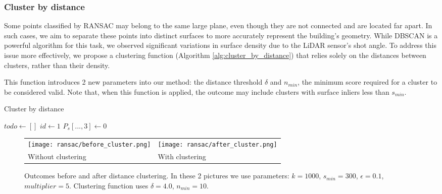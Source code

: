 \documentclass[a4paper,9pt]{article}
\begin{document}
\subsubsection{Cluster by distance}
Some points classified by RANSAC may belong to the same large plane, even though they are not connected and are located far apart. In such cases, we aim to separate these points into distinct surfaces to more accurately represent the building's geometry. While DBSCAN is a powerful algorithm for this task, we observed significant variations in surface density due to the LiDAR sensor's shot angle. To address this issue more effectively, we propose a clustering function (Algorithm \ref{alg:cluster_by_distance}) that relies solely on the distances between clusters, rather than their density.
\\\par
This function introduces 2 new parameters into our method: the distance threshold $\delta$ and $n_{min}$, the minimum score required for a cluster to be considered valid. Note that, when this function is applied, the outcome may include clusters with surface inliers less than $s_{min}$.

\begin{algorithm}[H]
\caption{Cluster by distance}
\label{alg:cluster_by_distance}

$todo \gets [ ]$\;
$id \gets 1$\;
$P_s[...,3] \gets 0$\;

\end{algorithm}

\begin{figure}[H]
    \begin{tabularx}{\textwidth}{XX}
        \texttt{[image: ransac/before\_cluster.png]} &
        \texttt{[image: ransac/after\_cluster.png]} \\
        Without clustering & With clustering
    \end{tabularx}
    \caption{Outcomes before and after distance clustering. In these 2 pictures we use parameters: $k=1000$, $s_{min}=300$, $\epsilon=0.1$, $multiplier=5$. Clustering function uses $\delta=4.0$, $n_{min}=10$.}
    \label{fig:cluster_by_distance}
\end{figure}
\end{document}
